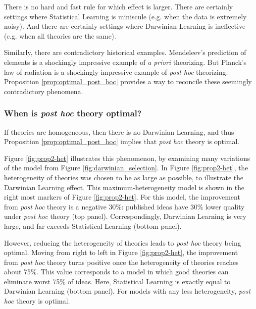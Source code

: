 \documentclass[12pt,english]{article}
\theoremstyle{plain}
\theoremstyle{plain}
\begin{document}
There is no hard and fast rule for which effect is larger. There are certainly settings where Statistical Learning is miniscule (e.g. when the data is extremely noisy). And there are certainly settings where Darwinian Learning is ineffective (e.g. when all theories are the same). 

Similarly, there are contradictory historical examples. Mendeleev's prediction of elements is a shockingly impressive example of \emph{a priori} theorizing. But Planck's law of radiation is a shockingly impressive example of \emph{post hoc} theorizing. Proposition \ref{prop:optimal_post_hoc} provides a way to reconcile these seemingly contradictory phenomena.


\subsubsection{When is \emph{post hoc} theory optimal?}\label{sec:het-figures}

If theories are homogeneous, then there is no Darwinian Learning, and thus Proposition \ref{prop:optimal_post_hoc} implies that \emph{post hoc} theory is optimal.

Figure \ref{fig:prop2-het} illustrates this phenomenon, by examining many variations of the model from Figure \ref{fig:darwinian_selection}. In Figure \ref{fig:prop2-het}, the heterogeneity of theories was chosen to be as large as possible, to illustrate the Darwinian Learning effect. This maximum-heterogeneity model is shown in the right most markers of Figure \ref{fig:prop2-het}. For this model, the improvement from \emph{post hoc} theory is a negative 30\%: published ideas have 30\% lower quality under \emph{post hoc} theory (top panel). Correspondingly, Darwinian Learning is very large, and far exceeds Statistical Learning (bottom panel).

However, reducing the heterogeneity of theories leads to \emph{post hoc} theory being optimal. Moving from right to left in Figure \ref{fig:prop2-het}, the improvement from \emph{post hoc} theory turns positive once the heterogeneity of theories reaches about 75\%. This value corresponds to a model in which good theories can eliminate worst 75\% of ideas. Here, Statistical Learning is exactly equal to Darwinian Learning (bottom panel). For models with any less heterogeneity, \emph{post hoc} theory is optimal.
\end{document}
